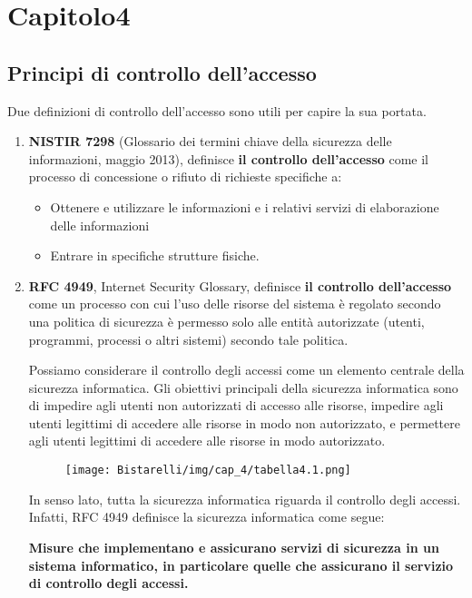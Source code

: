 \newpage
\chapter{Capitolo4}
\section{Principi di controllo dell'accesso}
Due definizioni di controllo dell'accesso sono utili per capire la sua portata.
\begin{enumerate}
    \item \textbf{NISTIR 7298} (Glossario dei termini chiave della sicurezza delle informazioni, maggio 2013), definisce \textbf{il controllo dell'accesso} come il processo di concessione o rifiuto di richieste specifiche a:
    
    \begin{itemize}
        \item  Ottenere e utilizzare le informazioni e i relativi servizi di elaborazione delle informazioni
        
        \item  Entrare in specifiche strutture fisiche.
    \end{itemize}
    
    \item \textbf{RFC 4949}, Internet Security Glossary, definisce \textbf{il controllo dell'accesso} come un processo con cui l'uso delle risorse del sistema è regolato secondo una politica di sicurezza è permesso solo alle entità autorizzate (utenti, programmi, processi o altri sistemi) secondo tale politica.
    
Possiamo considerare il controllo degli accessi come un elemento centrale della sicurezza informatica. Gli obiettivi principali della sicurezza informatica sono di impedire agli utenti non autorizzati di accesso alle risorse, impedire agli utenti legittimi di accedere alle risorse in modo non autorizzato, e permettere agli utenti legittimi di accedere alle risorse in modo autorizzato.

\begin{figure}[H]
	\centering
    \texttt{[image: Bistarelli/img/cap\_4/tabella4.1.png]}
\end{figure}

In senso lato, tutta la sicurezza informatica riguarda il controllo degli accessi. Infatti, RFC 4949 definisce la sicurezza informatica come segue:

\begin{center}
    \textbf{Misure che implementano e assicurano servizi di sicurezza in un sistema informatico, in particolare quelle che assicurano il servizio di controllo degli accessi.}
\end{center}
\end{enumerate}
\newpage
